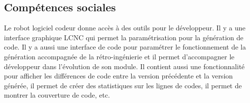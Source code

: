 \subsection{Compétences sociales}
Le robot logiciel codeur donne accès à des outils pour le développeur. Il y a une interface graphique LCNC qui permet la paramétrisation pour la génération de code. Il y a aussi une interface de code pour paramétrer le fonctionnement de la génération accompagnée de la rétro-ingénierie et il permet d'accompagner le développeur dans l'évolution de son module. Il contient aussi une fonctionnalité pour afficher les différences de code entre la version précédente et la version générée, il permet de créer des statistiques sur les lignes de codes, il permet de montrer la couverture de code, etc.








